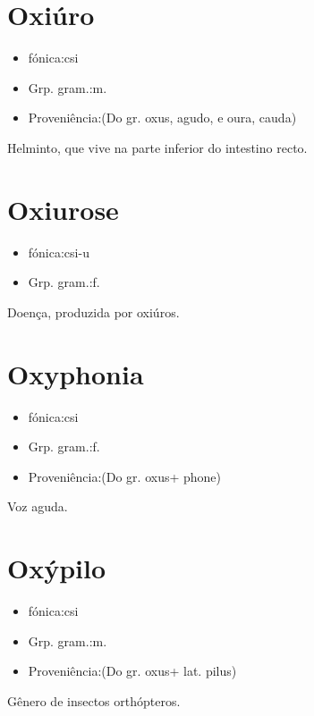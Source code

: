 \section{Oxiúro}
\begin{itemize}
\item {fónica:csi}
\end{itemize}
\begin{itemize}
\item {Grp. gram.:m.}
\end{itemize}
\begin{itemize}
\item {Proveniência:(Do gr. \textunderscore oxus\textunderscore , agudo, e \textunderscore oura\textunderscore , cauda)}
\end{itemize}
Helminto, que vive na parte inferior do intestino recto.
\section{Oxiurose}
\begin{itemize}
\item {fónica:csi-u}
\end{itemize}
\begin{itemize}
\item {Grp. gram.:f.}
\end{itemize}
Doença, produzida por oxiúros.
\section{Oxyphonia}
\begin{itemize}
\item {fónica:csi}
\end{itemize}
\begin{itemize}
\item {Grp. gram.:f.}
\end{itemize}
\begin{itemize}
\item {Proveniência:(Do gr. \textunderscore oxus\textunderscore  + \textunderscore phone\textunderscore )}
\end{itemize}
Voz aguda.
\section{Oxýpilo}
\begin{itemize}
\item {fónica:csi}
\end{itemize}
\begin{itemize}
\item {Grp. gram.:m.}
\end{itemize}
\begin{itemize}
\item {Proveniência:(Do gr. \textunderscore oxus\textunderscore  + lat. \textunderscore pilus\textunderscore )}
\end{itemize}
Gênero de insectos orthópteros.
